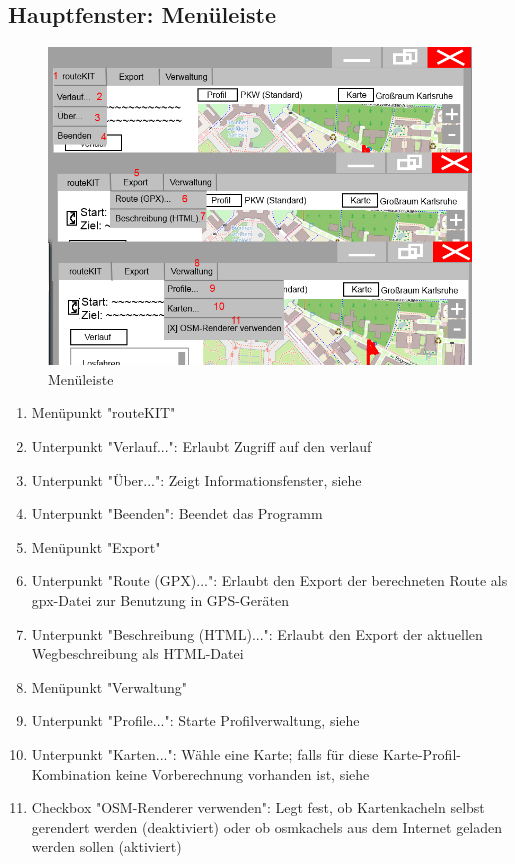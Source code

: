 \documentclass[a4paper, 11pt]{article}
\begin{document}
\subsection{Hauptfenster: Menüleiste}
\begin{figure}[H]
\centering
\includegraphics[width=0.7\linewidth]{mockup_screenshot_menu}
\caption{Menüleiste}
\label{fig:mockupscreenshotmenu}
\end{figure}
\begin{enumerate}
\item Menüpunkt "routeKIT"
\item Unterpunkt "Verlauf...": Erlaubt Zugriff auf den \gls{verlauf}
\item Unterpunkt "Über...": Zeigt Informationsfenster, siehe 
\item Unterpunkt "Beenden": Beendet das Programm
\item Menüpunkt "Export"
\item Unterpunkt "Route (GPX)...": Erlaubt den Export der berechneten Route als \gls{gpx}-Datei zur Benutzung in GPS-Geräten
\item Unterpunkt "Beschreibung (HTML)...": Erlaubt den Export der aktuellen Wegbeschreibung als HTML-Datei
\item Menüpunkt "Verwaltung"
\item Unterpunkt "Profile...": Starte Profilverwaltung, siehe 
\item Unterpunkt "Karten...": Wähle eine Karte; falls für diese Karte-Profil-Kombination keine Vorberechnung vorhanden ist, siehe 
\item Checkbox "OSM-Renderer verwenden": Legt fest, ob Kartenkacheln selbst gerendert werden (deaktiviert) oder ob \glspl{osmkachel} aus dem Internet geladen werden sollen (aktiviert)
\end{enumerate}
\end{document}
